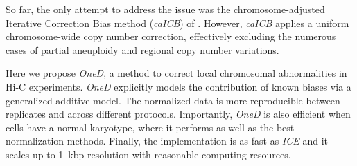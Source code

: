 \documentclass{bioinfo}
\begin{document}
So far, the only attempt to address the issue was the chromosome-adjusted
Iterative Correction Bias method (\textit{caICB}) of
\cite{wu2016computational}. However, \textit{caICB} applies a uniform
chromosome-wide copy number correction, effectively excluding the numerous
cases of partial aneuploidy and regional copy number variations.

Here we propose \textit{OneD}, a method to correct local chromosomal
abnormalities in Hi-C experiments. \textit{OneD} explicitly models the
contribution of known biases via a generalized additive model. The
normalized data is more reproducible between replicates and across
different protocols. Importantly, \textit{OneD} is also efficient when
cells have a normal karyotype, where it performs as well as the best
normalization methods. Finally, the implementation is as fast as
\textit{ICE} and it scales up to 1~kbp resolution with reasonable
computing resources.

\end{document}

